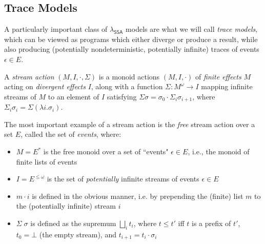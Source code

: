 \documentclass[acmsmall,screen,review]{acmart}
\newcommand{\ms}[1]{\ensuremath{\mathsf{#1}}}
\newcommand{\isotopessa}{\(\lambda_{\ms{SSA}}\)}
\begin{document}
\subsection{Trace Models}

A particularly important class of \isotopessa{} models are what we will call \emph{trace models},
which can be viewed as programs which either diverge or produce a result, while also producing
(potentially nondeterministic, potentially infinite) traces of events $\epsilon \in E$.

\begin{definition}
  A \textit{stream action} $(M, I, \cdot, \Sigma)$ is a monoid actions $(M, I, \cdot)$ of
  \emph{finite effects} $M$ acting on \emph{divergent effects} $I$, along with a function $\Sigma :
  M^\omega \to I$ mapping infinite streams of $M$ to an element of $I$ satisfying $\Sigma \sigma =
  \sigma_0 \cdot \Sigma_i \sigma_{i + 1}$, where $\Sigma_i \sigma_i = \Sigma (\lambda i. \sigma_i)$.
\end{definition}
The most important example of a stream action is the \emph{free} stream action over a set $E$,
called the set of \emph{events}, where:
\begin{itemize}
  \item $M = E^*$ is the free monoid over a set of ``events" $\epsilon \in E$, i.e., the monoid of
  finite lists of events
  \item $I = E^{\leq \omega}$ is the set of \textit{potentially} infinite streams of events
  $\epsilon \in E$
  \item $m \cdot i$ is defined in the obvious manner, i.e. by prepending the (finite) list $m$ to
  the (potentially infinite) stream $i$
  \item $\Sigma\;\sigma$ is defined as the supremum $\bigsqcup_it_i$, where $t \leq t'$ iff $t$ is a
  prefix of $t'$, $t_0 = \bot$ (the empty stream), and $t_{i + 1} = t_i \cdot \sigma_i$
\end{itemize}
\end{document}
